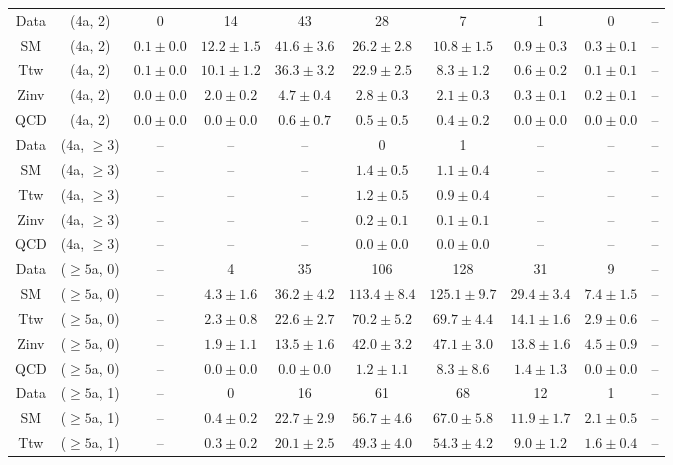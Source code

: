 \begin{table}[h!]
{\begin{tabular}{cccccccccc}
	Data & (4a, 2) & 0 & 14 & 43 & 28 & 7 & 1 & 0 & -- \\[0.5ex] 
	SM & (4a, 2) & $0.1\pm 0.0$ & $12.2\pm 1.5$ & $41.6\pm 3.6$ & $26.2\pm 2.8$ & $10.8\pm 1.5$ & $0.9\pm 0.3$ & $0.3\pm 0.1$ & -- \\[0.5ex] 
	Ttw & (4a, 2) & $0.1\pm 0.0$ & $10.1\pm 1.2$ & $36.3\pm 3.2$ & $22.9\pm 2.5$ & $8.3\pm 1.2$ & $0.6\pm 0.2$ & $0.1\pm 0.1$ & -- \\[0.5ex] 
	Zinv & (4a, 2) & $0.0\pm 0.0$ & $2.0\pm 0.2$ & $4.7\pm 0.4$ & $2.8\pm 0.3$ & $2.1\pm 0.3$ & $0.3\pm 0.1$ & $0.2\pm 0.1$ & -- \\[0.5ex] 
	QCD & (4a, 2) & $0.0\pm 0.0$ & $0.0\pm 0.0$ & $0.6\pm 0.7$ & $0.5\pm 0.5$ & $0.4\pm 0.2$ & $0.0\pm 0.0$ & $0.0\pm 0.0$ & -- \\[0.5ex] 
	Data & (4a, $\ge3$) & -- & -- & -- & 0 & 1 & -- & -- & -- \\[0.5ex] 
	SM & (4a, $\ge3$) & -- & -- & -- & $1.4\pm 0.5$ & $1.1\pm 0.4$ & -- & -- & -- \\[0.5ex] 
	Ttw & (4a, $\ge3$) & -- & -- & -- & $1.2\pm 0.5$ & $0.9\pm 0.4$ & -- & -- & -- \\[0.5ex] 
	Zinv & (4a, $\ge3$) & -- & -- & -- & $0.2\pm 0.1$ & $0.1\pm 0.1$ & -- & -- & -- \\[0.5ex] 
	QCD & (4a, $\ge3$) & -- & -- & -- & $0.0\pm 0.0$ & $0.0\pm 0.0$ & -- & -- & -- \\[0.5ex] 
	Data & ($\ge5$a, 0) & -- & 4 & 35 & 106 & 128 & 31 & 9 & -- \\[0.5ex] 
	SM & ($\ge5$a, 0) & -- & $4.3\pm 1.6$ & $36.2\pm 4.2$ & $113.4\pm 8.4$ & $125.1\pm 9.7$ & $29.4\pm 3.4$ & $7.4\pm 1.5$ & -- \\[0.5ex] 
	Ttw & ($\ge5$a, 0) & -- & $2.3\pm 0.8$ & $22.6\pm 2.7$ & $70.2\pm 5.2$ & $69.7\pm 4.4$ & $14.1\pm 1.6$ & $2.9\pm 0.6$ & -- \\[0.5ex] 
	Zinv & ($\ge5$a, 0) & -- & $1.9\pm 1.1$ & $13.5\pm 1.6$ & $42.0\pm 3.2$ & $47.1\pm 3.0$ & $13.8\pm 1.6$ & $4.5\pm 0.9$ & -- \\[0.5ex] 
	QCD & ($\ge5$a, 0) & -- & $0.0\pm 0.0$ & $0.0\pm 0.0$ & $1.2\pm 1.1$ & $8.3\pm 8.6$ & $1.4\pm 1.3$ & $0.0\pm 0.0$ & -- \\[0.5ex] 
	Data & ($\ge5$a, 1) & -- & 0 & 16 & 61 & 68 & 12 & 1 & -- \\[0.5ex] 
	SM & ($\ge5$a, 1) & -- & $0.4\pm 0.2$ & $22.7\pm 2.9$ & $56.7\pm 4.6$ & $67.0\pm 5.8$ & $11.9\pm 1.7$ & $2.1\pm 0.5$ & -- \\[0.5ex] 
	Ttw & ($\ge5$a, 1) & -- & $0.3\pm 0.2$ & $20.1\pm 2.5$ & $49.3\pm 4.0$ & $54.3\pm 4.2$ & $9.0\pm 1.2$ & $1.6\pm 0.4$ & -- \\[0.5ex] 

\end{tabular}}
\end{table}
